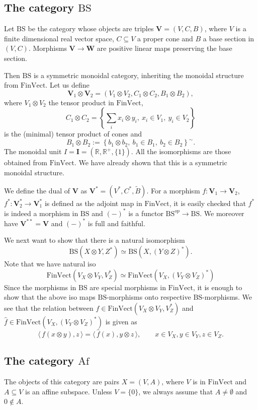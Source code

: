 \documentclass[12pt]{article}
\theoremstyle{definition}
\theoremstyle{remark}
\def\<{\langle\,}
\def\>{\,\rangle}
\def \BS{\mathrm{BS}}
\def \Af{\mathrm{Af}}
\def \FV{\mathrm{FinVect}}
\def\bV{\mathbf V}
\def\bW{\mathbf W}
\def\bX{ X}
\def\bY{ Y}
\def\bZ{Z}
\begin{document}
\subsection{The category $\BS$}

Let $\BS$ be the category whose objects are triples $\bV=(V,C,B)$, where $V$ is a finite
dimensional real vector space, $C\subseteq V$ a proper cone and $B$ a base section in $(V,C)$. 
Morphisms $\bV\to \bW$ are positive linear maps  preserving the base section.


Then $\BS$ is a symmetric monoidal category, inheriting the monoidal structure from $\FV$. 
Let us define 
\[
\bV_1\otimes \bV_2=(V_1\otimes V_2, C_1\otimes C_2, B_1\otimes B_2),
\]
where $V_1\otimes V_2$ the tensor product in $\FV$,
\[
C_1\otimes C_2=\left\{\sum_i x_i\otimes y_i,\ x_i\in V_1,\ y_i\in V_2\right\}
\]
is the (minimal) tensor product of cones and 
\[
B_1\otimes B_2:=\left\{b_1\otimes b_2,\ b_1\in B_1,\ b_2\in B_2\right\}^{\sim}.
\]
The monoidal unit $I=\mathbf{I}=(\mathbb R,\mathbb R^+,\{1\})$. All the isomorphisms are
those obtained from $\FV$. We have already shown that this is a symmetric monoidal structure.

We define the dual of $\bV$ as $\bV^*=(V^*,C^*,\tilde B)$. For a morphism
$f:\bV_1\to\bV_2$, $f^*:\bV_2^*\to \bV_1^*$ is defined as the adjoint map in $\FV$, it is
easily checked that $f^*$ is indeed a morphism in $\BS$ and $(-)^*$ is a functor
$\BS^{op}\to \BS$. We moreover have $\bV^{**}=\bV$ and $(-)^*$ is full and faithful.  

We next want to show that there is a natural isomorphism
\[
\BS(\bX\otimes \bY,\bZ^*)\simeq \BS(\bX,(\bY\otimes \bZ)^*).
\]
Note that we have natural iso 
\[
\FV(V_{\bX}\otimes V_{\bY},V^*_{\bZ})\simeq \FV(V_\bX,(V_\bY\otimes V_\bZ)^*)
\]
Since the morphisms in $\BS$ are special morphisms in $\FV$, it is enough to show that the
above iso maps  $\BS$-morphisms onto respective $\BS$-morphisms. We see that the relation
between $f\in \FV(V_{\bX}\otimes V_{\bY},V^*_{\bZ})$ and $\hat f\in
\FV(V_\bX,(V_\bY\otimes V_\bZ)^*)$ is given as
\[
\<f(x\otimes y),z\>=\<{\hat f}(x),y\otimes z\>,\qquad x\in V_\bX, y\in V_\bY, z\in V_\bZ.
\]



\subsection{The category $\Af$}

The objects of this category are pairs $\bX=(V,A)$, where $V$ is in $\FV$ and $A\subseteq
V$ is an affine subspace. Unless $V=\{0\}$, we always assume that $A\ne \emptyset$ and
$0\notin A$.
\end{document}
